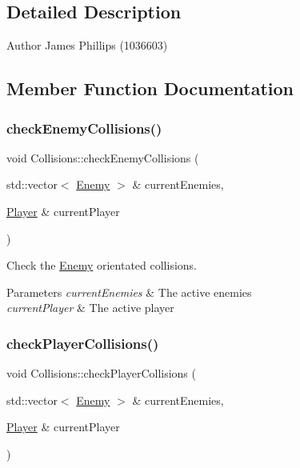 \subsection{Detailed Description}
\begin{DoxyAuthor}{Author}
James Phillips (1036603) 
\end{DoxyAuthor}


\subsection{Member Function Documentation}
\mbox{\label{class_collisions_aa628e8ae15bab7e085e4962be22ff16e}} 
\subsubsection{\texorpdfstring{check\+Enemy\+Collisions()}{checkEnemyCollisions()}}
{\footnotesize\ttfamily void Collisions\+::check\+Enemy\+Collisions (\begin{DoxyParamCaption}\item[{std\+::vector$<$ \hyperlink{class_enemy}{Enemy} $>$ \&}]{current\+Enemies,  }\item[{\hyperlink{class_player}{Player} \&}]{current\+Player }\end{DoxyParamCaption})}



Check the \hyperlink{class_enemy}{Enemy} orientated collisions. 


\begin{DoxyParams}{Parameters}
{\em current\+Enemies} & The active enemies \\
\hline
{\em current\+Player} & The active player \\
\hline
\end{DoxyParams}
\mbox{\label{class_collisions_a990174c72f4771e6c2a8c014bd873513}} 
\subsubsection{\texorpdfstring{check\+Player\+Collisions()}{checkPlayerCollisions()}}
{\footnotesize\ttfamily void Collisions\+::check\+Player\+Collisions (\begin{DoxyParamCaption}\item[{std\+::vector$<$ \hyperlink{class_enemy}{Enemy} $>$ \&}]{current\+Enemies,  }\item[{\hyperlink{class_player}{Player} \&}]{current\+Player }\end{DoxyParamCaption})}



